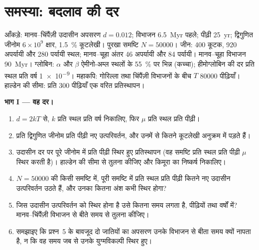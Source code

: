 \section{समस्या: बदलाव की दर}

\begin{problem}
\label{pb:b3:molecular-evolution:1}
आँकड़े: मानव--चिंपैंज़ी उदासीन अपसरण $d = 0.012$; विभाजन
\qty{6.5}{Myr} पहले; पीढ़ी \qty{25}{yr}; द्विगुणित जीनोम $6\times
10^{9}$ क्षार, \qty{1.5}{\%} कूटलेखी। पुरखा समष्टि $N =
\num{50000}$। जीन: 400 कूटक, 920 अपर्यायी और 280 पर्यायी
स्थल; मानव--चूहा अंतर 46 अपर्यायी और 84 पर्यायी।
मानव--चूहा विभाजन \qty{90}{Myr}। ग्लोबिन: $\alpha$ और $\beta$
ऐमीनो-अम्ल स्थलों के \qty{55}{\%} पर भिन्न (कच्चा); हीमोग्लोबिन की दर
प्रति स्थल प्रति वर्ष \num{1e-9}। महाकपि: गोरिल्ला तथा चिंपैंज़ी
विभाजनों के बीच $T$ \num{80000} पीढ़ियाँ। हाल्डेन की सीमा: प्रति
300 पीढ़ियाँ एक वरित प्रतिस्थापन।

\medskip
\noindent\textbf{भाग I --- वह दर।}
\begin{enumerate}
  \item $d = 2kT$ से, $k$ प्रति स्थल प्रति वर्ष निकालिए, फिर $\mu$
        प्रति स्थल प्रति पीढ़ी।
  \item प्रति द्विगुणित जीनोम प्रति पीढ़ी नए उत्परिवर्तन, और उनमें से
        कितने कूटलेखी अनुक्रम में पड़ते हैं।
  \item उदासीन दर पर पूरे जीनोम में प्रति पीढ़ी स्थिर हुए प्रतिस्थापन
        (वह समष्टि प्रति स्थल प्रति पीढ़ी $\mu$ स्थिर करती है)।
        हाल्डेन की सीमा से तुलना कीजिए और किमूरा का निष्कर्ष निकालिए।
  \item $N = \num{50000}$ की किसी समष्टि में, पूरी समष्टि में प्रति
        स्थल प्रति पीढ़ी कितने नए उदासीन उत्परिवर्तन उठते हैं, और उनका
        कितना अंश कभी स्थिर होगा?
  \item जिस उदासीन उत्परिवर्तन को स्थिर होना है उसे कितना समय लगता है,
        पीढ़ियों तथा वर्षों में? मानव--चिंपैंज़ी विभाजन से बीते समय से
        तुलना कीजिए।
  \item समझाइए कि प्रश्न~5 के बावजूद दो जातियों का अपसरण उनके विभाजन
        से बीता समय क्यों नापता है, न कि वह समय जब से उनके युग्मविकल्पी
        स्थिर हुए।
\end{enumerate}


\end{problem}
